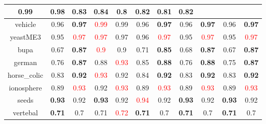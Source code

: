 \documentclass{article}%
\begin{document}
\begin{tabular}{c|cccccccccc}
{0.99
}&0.98&0.83&\textbf{0.84}&0.8&\textbf{0.82}&0.81&\textbf{0.82}\\%
\hline%
vehicle&0.96&\textbf{0.97}&\textcolor{red}{ 
0.99
}&0.99&0.96&\textbf{0.97}&0.96&\textbf{0.97}&0.96&\textbf{0.97}\\%
\hline%
yeastME3&0.95&\textcolor{red}{ 
0.97
}&\textcolor{red}{ 
0.97
}&0.97&0.96&\textcolor{red}{ 
0.97
}&0.95&\textcolor{red}{ 
0.97
}&0.95&\textcolor{red}{ 
0.97
}\\%
\hline%
bupa&0.67&\textbf{0.87}&\textcolor{red}{ 
0.9
}&0.9&0.71&\textbf{0.85}&0.68&\textbf{0.87}&0.67&\textbf{0.87}\\%
\hline%
german&0.76&\textbf{0.87}&0.88&\textcolor{red}{ 
0.93
}&0.85&\textbf{0.88}&0.76&\textbf{0.88}&0.75&\textbf{0.87}\\%
\hline%
horse\_colic&0.83&\textbf{0.92}&\textcolor{red}{ 
0.93
}&0.92&0.84&\textbf{0.92}&0.83&\textbf{0.92}&0.83&\textbf{0.92}\\%
\hline%
ionosphere&0.89&\textcolor{red}{ 
0.93
}&0.92&\textcolor{red}{ 
0.93
}&0.89&\textcolor{red}{ 
0.93
}&0.89&\textcolor{red}{ 
0.93
}&0.89&\textcolor{red}{ 
0.93
}\\%
\hline%
seeds&\textbf{0.93}&0.92&\textbf{0.93}&0.92&\textcolor{red}{ 
0.94
}&0.92&\textbf{0.93}&0.92&\textbf{0.93}&0.92\\%
\hline%
vertebal&\textbf{0.71}&0.7&0.71&\textcolor{red}{ 
0.72
}&\textbf{0.71}&0.7&\textbf{0.71}&0.7&\textbf{0.71}&0.7\\%
\hline%
\end{tabular}

%
\end{document}
